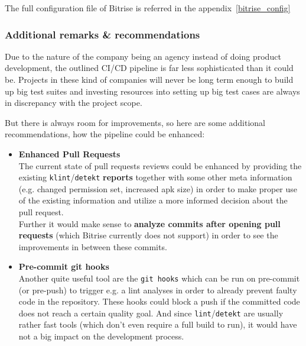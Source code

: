 The full configuration file of Bitrise is referred in the appendix~\ref{bitrise_config}

\subsubsection{Additional remarks \& recommendations}
Due to the nature of the company being an agency instead of doing product development, the outlined CI/CD pipeline is far less sophisticated than it could be. Projects in these kind of companies will never be long term enough to build up big test suites and investing resources into setting up big test cases are always in discrepancy with the project scope. 

But there is always room for improvements, so here are some additional recommendations, how the pipeline could be enhanced:

\begin{itemize}
	\item \textbf{Enhanced Pull Requests}\\
	The current state of pull requests reviews could be enhanced by providing the existing \texttt{klint}/\texttt{detekt} \textbf{reports} together with some other meta information (e.g. changed permission set, increased apk size) in order to make proper use of the existing information and utilize a more informed decision about the pull request.\\
	Further it would make sense to \textbf{analyze commits after opening pull requests} (which Bitrise currently does not support) in order to see the improvements in between these commits.
	\item \textbf{Pre-commit git hooks}\\
	Another quite useful tool are the \texttt{git hooks} which can be run on pre-commit (or pre-push) to trigger e.g. a lint analyses in order to already prevent faulty code in the repository. These hooks could block a push if the committed code does not reach a certain quality goal. And since \texttt{lint}/\texttt{detekt} are usually rather fast tools (which don't even require a full build to run), it would have not a big impact on the development process.
\end{itemize}

